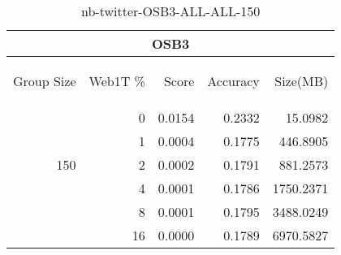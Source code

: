 \begin{center}
\begin{table}[htbp] 
 \begin{center}
\begin{tabular}{ | r | r | r | r | r |}
\hline
\multicolumn{5}{|c|}{OSB3}\\
\hline
\begin{sideways}Group Size\end{sideways} & \begin{sideways}Web1T \%\end{sideways} & \begin{sideways}Score\end{sideways} & \begin{sideways}Accuracy\end{sideways} & \begin{sideways}Size(MB)\end{sideways}\\
\hline
\multirow{5}{*}{150}
 & 0 & 0.0154 & 0.2332 & 15.0982\\ \cline{2-5}
 & 1 & 0.0004 & 0.1775 & 446.8905\\ \cline{2-5}
 & 2 & 0.0002 & 0.1791 & 881.2573\\ \cline{2-5}
 & 4 & 0.0001 & 0.1786 & 1750.2371\\ \cline{2-5}
 & 8 & 0.0001 & 0.1795 & 3488.0249\\ \cline{2-5}
 & 16 & 0.0000 & 0.1789 & 6970.5827\\ \cline{2-5}
\hline
\end{tabular}
\caption{nb-twitter-OSB3-ALL-ALL-150}
\label{table:nb-twitter-OSB3-ALL-ALL-150}
\end{center}
 \end{table}
\end{center}

